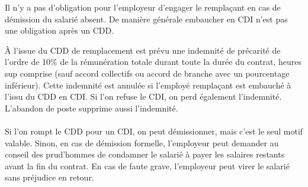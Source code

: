 	Il n'y a pas d’obligation pour l’employeur d’engager le remplaçant en cas de démission du salarié absent.
	De manière générale embaucher en CDI n'est pas une obligation après un CDD.

	À l’issue du CDD de remplacement est prévu une indemnité de précarité de l’ordre de 10\% de la rémunération totale durant toute la durée du contrat, heures sup comprise (sauf accord collectifs ou accord de branche avec un pourcentage inférieur).
	Cette indemnité est annulée si l’employé remplaçant est embauché à l’issu du CDD en CDI.
	Si l’on refuse le CDI, on perd également l’indemnité.
	L’abandon de poste supprime aussi l’indemnité.

	\paragraph{}
	Si l’on rompt le CDD pour un CDI, on peut démissionner, mais c'est le seul motif valable.
	Sinon, en cas de démission formelle, l’employeur peut demander au conseil des prud’hommes de condamner le salarié à payer les salaires restants avant la fin du contrat.
	En cas de faute grave, l’employeur peut virer le salarié sans préjudice en retour.
